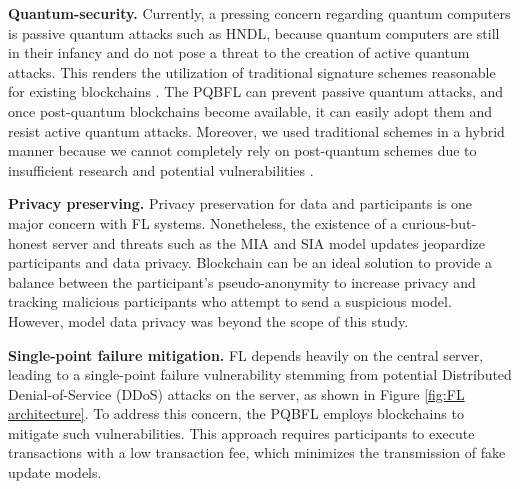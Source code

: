 \documentclass[a4paper,fleqn]{cas-dc}
\begin{document}
\noindent\textbf{Quantum-security.}
Currently, a pressing concern regarding quantum computers is passive quantum attacks such as HNDL,  because quantum computers are still in their infancy and do not pose a threat to the creation of active quantum attacks.
This renders the utilization of traditional signature schemes reasonable for existing blockchains \citep{Google_blog}.
The PQBFL can prevent passive quantum attacks, and once post-quantum blockchains become available, it can easily adopt them and resist active quantum attacks.
Moreover, we used traditional schemes in a hybrid manner because we cannot completely rely on post-quantum schemes due to insufficient research and potential vulnerabilities \citep{An_efficient_key,Transition_to_Post-Quantum}.

\noindent\textbf{Privacy preserving.}
Privacy preservation for data and participants is one major concern with FL systems. 
Nonetheless, the existence of a curious-but-honest server and threats such as the MIA and SIA model updates jeopardize participants and data privacy.
Blockchain can be an ideal solution to provide a balance between the participant's pseudo-anonymity to increase privacy and tracking malicious participants who attempt to send a suspicious model. 
However, model data privacy was beyond the scope of this study.

\noindent\textbf{Single-point failure mitigation.}
FL depends heavily on the central server, leading to a single-point failure vulnerability stemming from potential Distributed Denial-of-Service (DDoS) attacks on the server, as shown in Figure \ref{fig:FL architecture}.  
To address this concern, the PQBFL employs  blockchains to mitigate such vulnerabilities.  This approach requires participants to execute transactions with a low transaction fee, which minimizes the transmission of fake update models.
\end{document}
